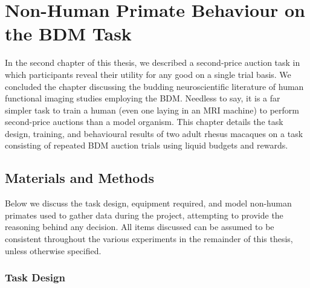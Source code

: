 \chapter{Non-Human Primate Behaviour on the BDM Task}

\ifpdf
    \graphicspath{{Chapter3/Figs/Raster/}{Chapter3/Figs/PDF/}{Chapter3/Figs/}}
\else
    \graphicspath{{Chapter3/Figs/Vector/}{Chapter3/Figs/}}
\fi

In the second chapter of this thesis, we described a second-price auction task in which participants reveal their utility for any good on a single trial basis. We concluded the chapter discussing the budding neuroscientific literature of human functional imaging studies employing the BDM. Needless to say, it is a far simpler task to train a human (even one laying in an MRI machine) to perform second-price auctions than a model organism. This chapter details the task design, training, and behavioural results of two adult rhesus macaques on a task consisting of repeated BDM auction trials using liquid budgets and rewards. 

\clearpage
\section{Materials and Methods}

Below we discuss the task design, equipment required, and model non-human primates used to gather data during the project, attempting to provide the reasoning behind any decision. All items discussed can be assumed to be consistent throughout the various experiments in the remainder of this thesis, unless otherwise specified.

\subsection{Task Design}

